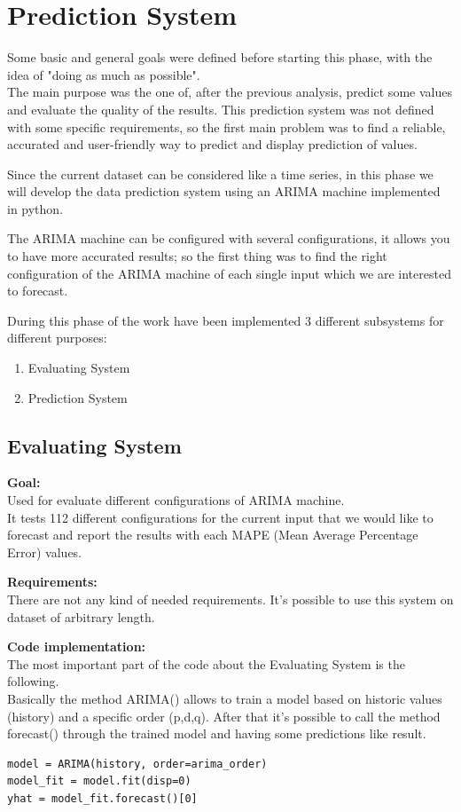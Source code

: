 
\chapter{Prediction System}

Some basic and general goals were defined before starting this phase, with the idea of "doing as much as possible". \\
The main purpose was the one of, after the previous analysis, predict some values and evaluate the quality of the results.
This prediction system was not defined with some specific requirements, so the first main problem was to find a reliable, accurated and user-friendly way to predict and display prediction of values.

Since the current dataset can be considered like a time series, in this phase we will develop the data prediction system using an ARIMA machine implemented in python.

The ARIMA machine can be configured with several configurations, it allows you to have more accurated results; so the first thing was to find the right configuration of the ARIMA machine of each single input which we are interested to forecast.

During this phase of the work have been implemented 3 different subsystems for different purposes:
\begin{enumerate}
\item Evaluating System
\item Prediction System
\end{enumerate}

\newpage
\section{Evaluating System}
\textbf{Goal:}\\ 
Used for evaluate different configurations of ARIMA machine. \\ It tests 112 different configurations for the current input that we would like to forecast and report the results with each MAPE (Mean Average Percentage Error) values.

\textbf{Requirements:}\\
There are not any kind of needed requirements. It's possible to use this system on dataset of arbitrary length.

\textbf{Code implementation:}\\
The most important part of the code about the Evaluating System is the following.\\
Basically the method ARIMA() allows to train a model based on historic values (history) and a specific order (p,d,q). After that it's possible to call the method forecast() through the trained model and having some predictions like result.
\begin{lstlisting}
model = ARIMA(history, order=arima_order)
model_fit = model.fit(disp=0)
yhat = model_fit.forecast()[0]
\end{lstlisting}

